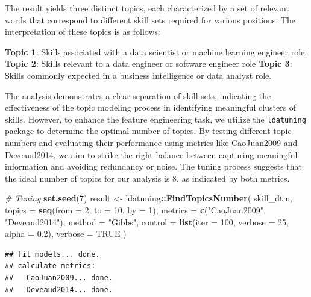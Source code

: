 \documentclass[11pt,]{article}
\newenvironment{Shaded}{\begin{snugshade}}{\end{snugshade}}
\newcommand{\AttributeTok}[1]{\textcolor[rgb]{0.13,0.29,0.53}{#1}}
\newcommand{\CommentTok}[1]{\textcolor[rgb]{0.56,0.35,0.01}{\textit{#1}}}
\newcommand{\ConstantTok}[1]{\textcolor[rgb]{0.56,0.35,0.01}{#1}}
\newcommand{\DecValTok}[1]{\textcolor[rgb]{0.00,0.00,0.81}{#1}}
\newcommand{\FloatTok}[1]{\textcolor[rgb]{0.00,0.00,0.81}{#1}}
\newcommand{\FunctionTok}[1]{\textcolor[rgb]{0.13,0.29,0.53}{\textbf{#1}}}
\newcommand{\NormalTok}[1]{#1}
\newcommand{\OtherTok}[1]{\textcolor[rgb]{0.56,0.35,0.01}{#1}}
\newcommand{\SpecialCharTok}[1]{\textcolor[rgb]{0.81,0.36,0.00}{\textbf{#1}}}
\newcommand{\StringTok}[1]{\textcolor[rgb]{0.31,0.60,0.02}{#1}}
\begin{document}
The result yields three distinct topics, each characterized by a set of
relevant words that correspond to different skill sets required for
various positions. The interpretation of these topics is as follows:

\textbf{Topic 1}: Skills associated with a data scientist or machine
learning engineer role. \textbf{Topic 2}: Skills relevant to a data
engineer or software engineer role \textbf{Topic 3}: Skills commonly
expected in a business intelligence or data analyst role.

The analysis demonstrates a clear separation of skill sets, indicating
the effectiveness of the topic modeling process in identifying
meaningful clusters of skills. However, to enhance the feature
engineering task, we utilize the \texttt{ldatuning} package to determine
the optimal number of topics. By testing different topic numbers and
evaluating their performance using metrics like CaoJuan2009 and
Deveaud2014, we aim to strike the right balance between capturing
meaningful information and avoiding redundancy or noise. The tuning
process suggests that the ideal number of topics for our analysis is 8,
as indicated by both metrics.

\begin{Shaded}
\begin{Highlighting}[]
\CommentTok{\# Tuning}
\FunctionTok{set.seed}\NormalTok{(}\DecValTok{7}\NormalTok{)}
\NormalTok{result }\OtherTok{\textless{}{-}}\NormalTok{ ldatuning}\SpecialCharTok{::}\FunctionTok{FindTopicsNumber}\NormalTok{(}
\NormalTok{  skill\_dtm,}
  \AttributeTok{topics =} \FunctionTok{seq}\NormalTok{(}\AttributeTok{from =} \DecValTok{2}\NormalTok{, }\AttributeTok{to =} \DecValTok{10}\NormalTok{, }\AttributeTok{by =} \DecValTok{1}\NormalTok{),}
  \AttributeTok{metrics =} \FunctionTok{c}\NormalTok{(}\StringTok{"CaoJuan2009"}\NormalTok{,  }\StringTok{"Deveaud2014"}\NormalTok{),}
  \AttributeTok{method =} \StringTok{"Gibbs"}\NormalTok{,}
  \AttributeTok{control =} \FunctionTok{list}\NormalTok{(}\AttributeTok{iter =} \DecValTok{100}\NormalTok{, }\AttributeTok{verbose =} \DecValTok{25}\NormalTok{, }\AttributeTok{alpha =} \FloatTok{0.2}\NormalTok{),}
  \AttributeTok{verbose =} \ConstantTok{TRUE}
\NormalTok{)}
\end{Highlighting}
\end{Shaded}

\begin{verbatim}
## fit models... done.
## calculate metrics:
##   CaoJuan2009... done.
##   Deveaud2014... done.
\end{verbatim}
\end{document}

